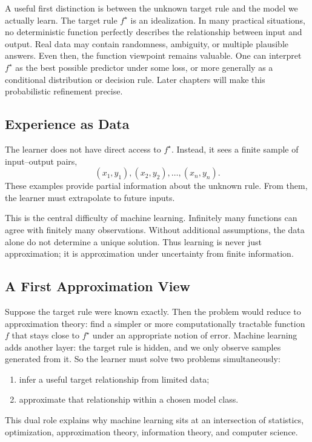 A useful first distinction is between the unknown target rule and the model we actually learn. The target rule $f^\star$ is an idealization. In many practical situations, no deterministic function perfectly describes the relationship between input and output. Real data may contain randomness, ambiguity, or multiple plausible answers. Even then, the function viewpoint remains valuable. One can interpret $f^\star$ as the best possible predictor under some loss, or more generally as a conditional distribution or decision rule. Later chapters will make this probabilistic refinement precise.

\subsection{Experience as Data}

The learner does not have direct access to $f^\star$. Instead, it sees a finite sample of input--output pairs,
\[
(x_1,y_1), (x_2,y_2), \dots, (x_n,y_n).
\]
These examples provide partial information about the unknown rule. From them, the learner must extrapolate to future inputs.

This is the central difficulty of machine learning. Infinitely many functions can agree with finitely many observations. Without additional assumptions, the data alone do not determine a unique solution. Thus learning is never just approximation; it is approximation under uncertainty from finite information.

\subsection{A First Approximation View}

Suppose the target rule were known exactly. Then the problem would reduce to approximation theory: find a simpler or more computationally tractable function $f$ that stays close to $f^\star$ under an appropriate notion of error. Machine learning adds another layer: the target rule is hidden, and we only observe samples generated from it. So the learner must solve two problems simultaneously:
\begin{enumerate}
    \item infer a useful target relationship from limited data;
    \item approximate that relationship within a chosen model class.
\end{enumerate}

This dual role explains why machine learning sits at an intersection of statistics, optimization, approximation theory, information theory, and computer science.

